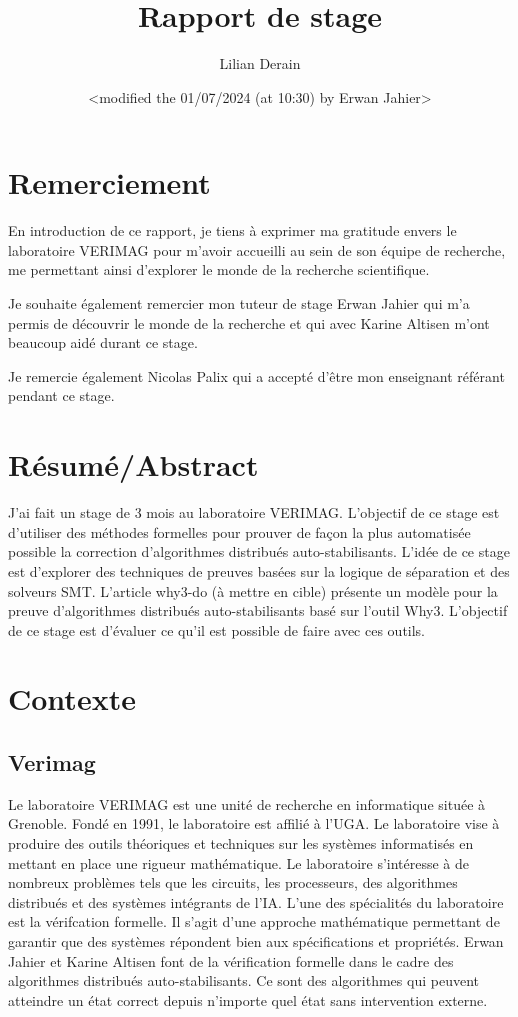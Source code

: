 \documentclass[11pt]{article}
\author{Lilian Derain}
\date{<modified the 01/07/2024 (at 10:30) by Erwan Jahier>}
\title{Rapport de stage}
\begin{document}
\section{Remerciement}
\label{sec:org460de28}
  En introduction de ce rapport, je tiens à exprimer ma gratitude envers le laboratoire
VERIMAG pour m’avoir accueilli au sein de son équipe de recherche, me
permettant ainsi d’explorer le monde de la recherche scientifique.

Je souhaite également remercier mon tuteur de stage Erwan Jahier qui m'a permis de découvrir le 
monde de la recherche et qui avec Karine Altisen m'ont beaucoup aidé durant ce stage.

Je remercie également Nicolas Palix qui a accepté d’être mon enseignant référant pendant
ce stage. 

\section{Résumé/Abstract}
\label{sec:org0a7085f}
  J'ai fait un stage de 3 mois au laboratoire  VERIMAG. 
  L'objectif de ce stage est d'utiliser des méthodes formelles pour prouver de façon la plus automatisée possible la correction d'algorithmes distribués auto-stabilisants.
  L'idée de ce stage est d'explorer des techniques de preuves
basées sur la logique de séparation et  des solveurs SMT. 
L'article why3-do (à mettre en cible) présente un modèle 
pour la preuve d'algorithmes distribués auto-stabilisants basé sur l'outil Why3.  
  L'objectif de ce stage  est d'évaluer ce qu'il est possible de faire avec ces outils.

\section{Contexte}
\label{sec:org637280a}

\subsection{Verimag}
\label{sec:org923cc85}

   Le laboratoire VERIMAG est une unité de recherche en informatique située à Grenoble. Fondé
en 1991, le laboratoire est affilié à l’UGA. Le laboratoire vise à produire des outils théoriques
et techniques sur les systèmes informatisés en mettant en place une rigueur mathématique.
Le laboratoire s'intéresse à  de nombreux problèmes tels que les circuits, les processeurs, des algorithmes distribués et des systèmes intégrants de l’IA.
L’une des spécialités du laboratoire est la vérifcation formelle. Il s’agit d’une approche
mathématique permettant de garantir que des systèmes répondent bien aux spécifications
et propriétés. Erwan Jahier et Karine Altisen font de la vérification formelle dans le 
cadre des algorithmes distribués auto-stabilisants. Ce sont des algorithmes qui peuvent 
atteindre un état correct depuis n'importe quel état sans intervention externe.
\end{document}
